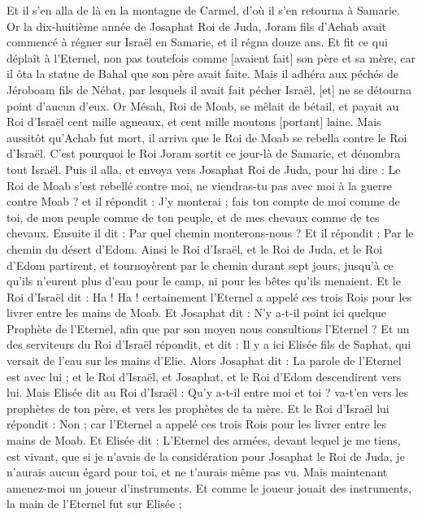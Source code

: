 \begin{multicols}{2}
Et il s'en alla de là en la montagne de Carmel, d'où il s'en retourna à Samarie.
\VerseOne{}Or la dix-huitième année de Josaphat Roi de Juda, Joram fils d'Achab avait commencé à régner sur Israël en Samarie, et il régna douze ans.
Et fit ce qui déplaît à l'Eternel, non pas toutefois comme [avaient fait] son père et sa mère, car il ôta la statue de Bahal que son père avait faite.
Mais il adhéra aux péchés de Jéroboam fils de Nébat, par lesquels il avait fait pécher Israël, [et] ne se détourna point d'aucun d'eux.
Or Mésah, Roi de Moab, se mêlait de bétail, et payait au Roi d'Israël cent mille agneaux, et cent mille moutons [portant] laine.
Mais aussitôt qu'Achab fut mort, il arriva que le Roi de Moab se rebella contre le Roi d'Israël.
C'est pourquoi le Roi Joram sortit ce jour-là de Samarie, et dénombra tout Israël.
Puis il alla, et envoya vers Josaphat Roi de Juda, pour lui dire : Le Roi de Moab s'est rebellé contre moi, ne viendras-tu pas avec moi à la guerre contre Moab ? et il répondit : J'y monterai ; fais ton compte de moi comme de toi, de mon peuple comme de ton peuple, et de mes chevaux comme de tes chevaux.
Ensuite il dit : Par quel chemin monterons-nous ? Et il répondit : Par le chemin du désert d'Edom.
Ainsi le Roi d'Israël, et le Roi de Juda, et le Roi d'Edom partirent, et tournoyèrent par le chemin durant sept jours, jusqu'à ce qu'ils n'eurent plus d'eau pour le camp, ni pour les bêtes qu'ils menaient.
Et le Roi d'Israël dit : Ha ! Ha ! certainement l'Eternel a appelé ces trois Rois pour les livrer entre les mains de Moab.
Et Josaphat dit : N'y a-t-il point ici quelque Prophète de l'Eternel, afin que par son moyen nous consultions l'Eternel ? Et un des serviteurs du Roi d'Israël répondit, et dit : Il y a ici Elisée fils de Saphat, qui versait de l'eau sur les mains d'Elie.
Alors Josaphat dit : La parole de l'Eternel est avec lui ; et le Roi d'Israël, et Josaphat, et le Roi d'Edom descendirent vers lui.
Mais Elisée dit au Roi d'Israël : Qu'y a-t-il entre moi et toi ? va-t'en vers les prophètes de ton père, et vers les prophètes de ta mère. Et le Roi d'Israël lui répondit : Non ; car l'Eternel a appelé ces trois Rois pour les livrer entre les mains de Moab.
Et Elisée dit : L'Eternel des armées, devant lequel je me tiens, est vivant, que si je n'avais de la considération pour Josaphat le Roi de Juda, je n'aurais aucun égard pour toi, et ne t'aurais même pas vu.
Mais maintenant amenez-moi un joueur d'instruments. Et comme le joueur jouait des instruments, la main de l'Eternel fut sur Elisée ;

\end{multicols}
